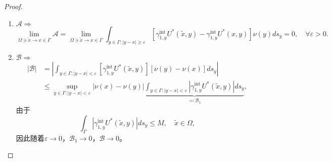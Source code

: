\begin{proof}
\begin{enumerate}
  \item $\mathcal{A} \Rightarrow$
  \begin{equation*}
    \lim_{\Omega \ni \widetilde{x} \rightarrow x \in \Gamma}
    \mathcal{A}
    = \lim_{\Omega \ni \widetilde{x} \rightarrow x \in \Gamma}
    \int_{y \in \Gamma: \left| y - x \right| \ge \varepsilon}
    \left[
    \gamma_{1,y}^{\text{int}}
    U^{*}(\widetilde{x},y)
    - \gamma_{1,y}^{\text{int}}
    U^{*}(x,y)
    \right]
    \nu(y)
    d s_y
     = 0, \quad \forall \varepsilon > 0.
  \end{equation*}
  \item $\mathcal{B} \Rightarrow$
  \begin{equation*}
  \begin{split}
  \left| \mathcal{B} \right|
  &= \left|
  \int_{y \in \Gamma: \left| y - x \right| < \varepsilon}
  \left[
  \gamma_{1,y}^{\text{int}}
  U^{*}(\widetilde{x},y)
  \right]
  \left[
  \nu(y) - \nu(x)
  \right]
  d s_y
  \right| \\
  & \le \sup_{y \in \Gamma : \left| y - x \right| < \varepsilon}
  \left| \nu(x) - \nu(y) \right|
  \underbrace{
  \int_{y \in \Gamma : \left| y - x \right| < \varepsilon}
  \left|
  \gamma_{1,y}^{\text{int}} U^{*}(\widetilde{x}, y )
  \right|
  d s_y
  }_{\eqqcolon \mathcal{B}_1}
  ,
  \end{split}
  \end{equation*}
  由于
  \begin{equation*}
    \int_{\Gamma }
    \left|
    \gamma_{1,y}^{\text{int}} U^{*}(\widetilde{x},y)
    \right|
    d s_y \le M, \quad \widetilde{x} \in \Omega,
  \end{equation*}
  因此随着$\varepsilon \rightarrow 0$，$\mathcal{B}_1 \rightarrow 0$，$\mathcal{B} \rightarrow 0$。


\end{enumerate}
\end{proof}
